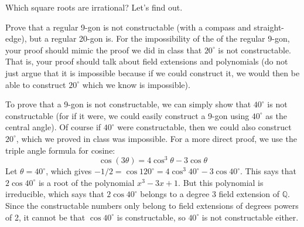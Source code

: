 \documentclass[11pt]{exam}
\def\Z{\mathbb{Z}}
\def\Q{\mathbb{Q}}
\begin{document}
\begin{questions}
\question[6] Which square roots are irrational?  Let's find out. 


\question[6] Prove that a regular 9-gon is not constructable (with a compass and straight-edge), but a regular 20-gon is.  For the impossibility of the of the regular 9-gon, your proof should mimic the proof we did in class that $20^\circ$ is not constructable.  That is, your proof should talk about field extensions and polynomials (do not just argue that it is impossible because if we could construct it, we would then be able to construct $20^\circ$ which we know is impossible).

\begin{solution}
To prove that a 9-gon is not constructable, we can simply show that $40^{\circ}$ is not constructable (for if it were, we could easily construct a 9-gon using $40^{\circ}$ as the central angle).  Of course if $40^{\circ}$ were constructable, then we could also construct $20^{\circ}$, which we proved in class was impossible.  For a more direct proof, we use the triple angle formula for cosine:
\[\cos(3\theta) = 4\cos^3\theta - 3\cos\theta\]
Let $\theta = 40^{\circ}$, which gives $-1/2 = \cos 120^{\circ} = 4 \cos^3 40^{\circ} - 3 \cos 40^{\circ}$.  This says that $2 \cos 40^{\circ}$ is a root of the polynomial $x^3 - 3x + 1$.  But this polynomial is irreducible, which says that $2 \cos 40^{\circ}$ belongs to a degree $3$ field extension of $\Q$.  Since the constructable numbers only belong to field extensions of degrees powers of 2, it cannot be that $\cos 40^{\circ}$ is constructable, so $40^{\circ}$ is not constructable either.


\end{solution}
\end{questions}
\end{document}
